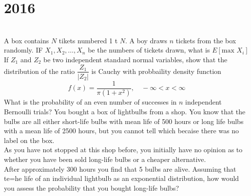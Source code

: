 \section*{2016}
\vspace{-.5cm}
\hrulefill \smallskip\\
 A box contains $N$ tikets numbered 1 t $N$. A boy draws $n$ tickets from the box randomly. IF $X_1,X_2,\ldots,X_n$ be the numbers of tickets drawn, what is $E[\text{max }X_i]$
\myline
{} If $Z_1$ and $Z_2$ be two independent standard normal variables, show that the distribution of the ratio $\dfrac{Z_1}{|Z_2|}$ is Cauchy with probbaility density function \[ f(x) = \dfrac{1}{\pi(1+x^2)}, \quad -\infty < x < \infty \]
\myline
{} What is the probability of an even number of successes in $n$ independent Bernoulli trials?
\myline
{} You bought a box of lightbulbs from a shop. You know that the bulbs are all either short-life bulbs with mean life of 500 hours or long life bulbs with a mean life of 2500 hours, but you cannot tell which becaise there was no label on the box.\\
As you have not stopped at this shop before, you initially have no opinion as to whether you have been sold long-life bulbs or a cheaper alternative.\\ After approximately 300 hours you find that 5 bulbs are alive. Assuming that te=he life of an individual lightbulb as an exponential distribution, how would you assess the probability that you bought long-life bulbs?